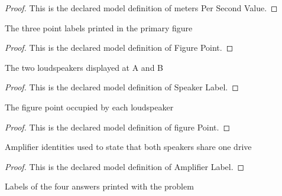 \begin{proof}
  This is the declared model definition of meters Per Second Value.
\end{proof}
\begin{definition}
  \label{def:physics:phyx-mini-0173:phyxminiproblems-problemphyxmini0173-figurepoint}
  The three point labels printed in the primary figure
\end{definition}
\begin{proof}
  This is the declared model definition of Figure Point.
\end{proof}
\begin{definition}
  \label{def:physics:phyx-mini-0173:phyxminiproblems-problemphyxmini0173-speakerlabel}
  The two loudspeakers displayed at A and B
\end{definition}
\begin{proof}
  This is the declared model definition of Speaker Label.
\end{proof}
\begin{definition}
  \label{def:physics:phyx-mini-0173:phyxminiproblems-problemphyxmini0173-speakerlabel-figurepoint}
  The figure point occupied by each loudspeaker
\end{definition}
\begin{proof}
  This is the declared model definition of figure Point.
\end{proof}
\begin{definition}
  \label{def:physics:phyx-mini-0173:phyxminiproblems-problemphyxmini0173-amplifierlabel}
  Amplifier identities used to state that both speakers share one drive
\end{definition}
\begin{proof}
  This is the declared model definition of Amplifier Label.
\end{proof}
\begin{definition}
  \label{def:physics:phyx-mini-0173:phyxminiproblems-problemphyxmini0173-answerchoice}
  Labels of the four answers printed with the problem
\end{definition}
